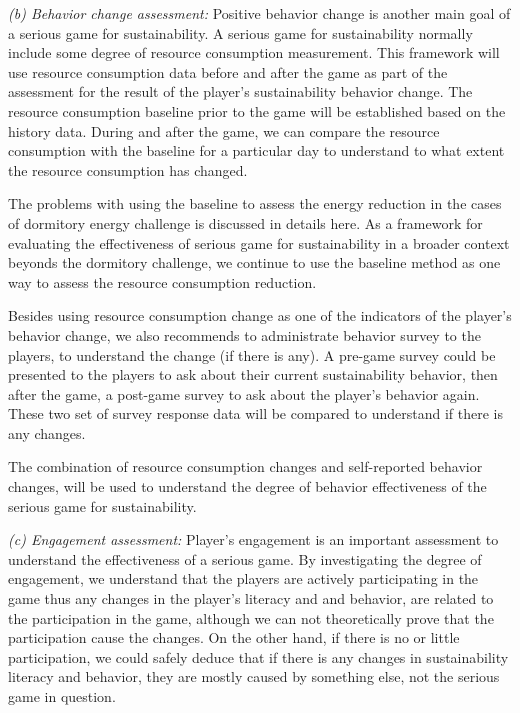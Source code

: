\documentclass{sigchi}
\begin{document}
\emph {(b) Behavior change assessment:}
Positive behavior change is another main goal of a serious game for sustainability. A serious game for sustainability normally include some degree of resource consumption measurement. This framework will use resource consumption data before and after the game as part of the assessment for the result of the player's sustainability behavior change.  The resource consumption baseline prior to the game will be established based on the history data. During and after the game, we can compare the resource consumption with the baseline for a particular day to understand to what extent the resource consumption has changed.

The problems with using the baseline to assess the energy reduction in the cases of dormitory energy challenge is discussed in details here\cite{csdl2-12-08}.
 As a framework for evaluating the effectiveness of serious game for sustainability in a broader context beyonds the dormitory challenge, we continue to use the baseline method as one way to assess the resource consumption reduction.

Besides using resource consumption change as one of the indicators of the player's behavior change, we also recommends to administrate behavior survey to the players, to understand the change (if there is any). A pre-game survey could be presented to the players to ask about their current sustainability behavior, then after the game, a post-game survey to ask about the player's behavior again. These two set of survey response data will be compared to understand if there is any changes.

The combination of resource consumption changes and self-reported behavior changes, will be used to understand the degree of behavior effectiveness of the serious game for sustainability.

\emph {(c) Engagement assessment:}
Player's engagement is an important assessment to understand the effectiveness of a serious game. By investigating the degree of engagement, we understand that the players are actively participating in the game thus any changes in the player's literacy and and behavior, are related to the participation in the game, although we can not theoretically prove that the participation cause the changes. On the other hand, if there is no or little participation, we could safely deduce that if there is any changes in sustainability literacy and behavior, they are mostly caused by something else, not the serious game in question.
\end{document}

